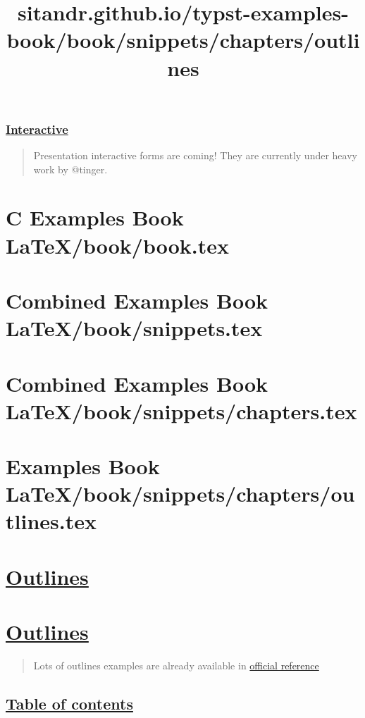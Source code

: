 \subsubsection{\texorpdfstring{\hyperref[interactive]{Interactive}}{Interactive}}\label{interactive}

\begin{quote}
Presentation interactive forms are coming! They are currently under
heavy work by @tinger.
\end{quote}






\section{C Examples Book LaTeX/book/book.tex}
\section{Combined Examples Book LaTeX/book/snippets.tex}
\section{Combined Examples Book LaTeX/book/snippets/chapters.tex}
\section{Examples Book LaTeX/book/snippets/chapters/outlines.tex}
\title{sitandr.github.io/typst-examples-book/book/snippets/chapters/outlines}

\section{\texorpdfstring{\hyperref[outlines]{Outlines}}{Outlines}}\label{outlines}

\section{\texorpdfstring{\hyperref[outlines-1]{Outlines}}{Outlines}}\label{outlines-1}

\begin{quote}
Lots of outlines examples are already available in
\href{https://typst.app/docs/reference/meta/outline/}{official
reference}
\end{quote}

\subsection{\texorpdfstring{\hyperref[table-of-contents]{Table of
contents}}{Table of contents}}\label{table-of-contents}

